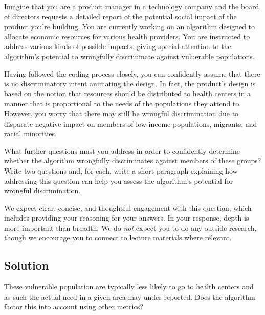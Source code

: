 \documentclass[submit]{harvardml}
\begin{document}
\newpage
\begin{problem}
Imagine that you are a product manager in a technology company and the board of directors requests a detailed report of the potential social impact of the product you're building. You are currently working on an algorithm designed to allocate economic resources for various health providers. You are instructed to address various kinds of possible impacts, giving special attention to the algorithm’s potential to wrongfully discriminate against vulnerable populations. 

Having followed the coding process closely, you can confidently assume that there is no discriminatory intent animating the design.  In fact, the product’s design is based on the notion that resources should be distributed to health centers in a manner that is proportional to the needs of the populations they attend to. However, you worry that there may still be wrongful discrimination due to disparate negative impact on members of low-income populations, migrants, and racial minorities. 

What further questions must you address in order to confidently determine whether the algorithm wrongfully discriminates against members of these groups? Write two questions and, for each, write a short paragraph explaining how addressing this question can help you assess the algorithm’s potential for wrongful discrimination.


We expect clear, concise, and thoughtful engagement with this question, which includes providing your reasoning for your answers.  In your response, depth is more important than breadth. We do \emph{not} expect you to do any outside research, though we encourage you to connect to lecture materials where relevant.

\end{problem}
\newpage
\subsection*{Solution}
     
    These vulnerable population are typically less likely to go to health centers and as such the actual need in a given area may under-reported. Does the algorithm factor this into account using other metrics?
     \vspace{.5cm}
     
\end{document}
